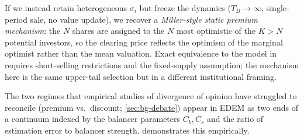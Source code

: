 If we instead retain heterogeneous $\sigma_{i}$ but freeze the
dynamics ($T_{B} \to \infty$, single-period sale, no value update),
we recover a \emph{Miller-style static premium mechanism}: the
$N$ shares are assigned to the $N$ most optimistic of the
$K > N$ potential investors, so the clearing price reflects the
optimism of the marginal optimist rather than the mean valuation.
Exact equivalence to the model in \citet{miller1977} requires
short-selling restrictions and the fixed-supply assumption; the
mechanism here is the same upper-tail selection but in a different
institutional framing.

The two regimes that empirical studies of divergence of opinion have
struggled to reconcile (premium vs.\ discount;
\cref{sec:bg-debate}) appear in EDEM as two ends of a continuum
indexed by the balancer parameters $C_{b}, C_{s}$ and the
ratio of estimation error to balancer strength. 
demonstrates this empirically.
